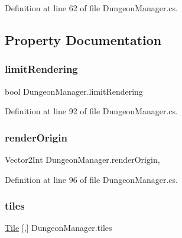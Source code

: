 Definition at line 62 of file Dungeon\+Manager.\+cs.



\subsection{Property Documentation}
\mbox{\label{class_dungeon_manager_a6f04a65ae61dd9b11d58489272b5fa70}} 
\subsubsection{\texorpdfstring{limitRendering}{limitRendering}}
{\footnotesize\ttfamily bool Dungeon\+Manager.\+limit\+Rendering\hspace{0.3cm}{\ttfamily [get]}}



Definition at line 92 of file Dungeon\+Manager.\+cs.

\mbox{\label{class_dungeon_manager_af1c37437d9ec1f72c4dc6a0300d226df}} 
\subsubsection{\texorpdfstring{renderOrigin}{renderOrigin}}
{\footnotesize\ttfamily Vector2\+Int Dungeon\+Manager.\+render\+Origin\hspace{0.3cm}{\ttfamily [get]}, {\ttfamily [set]}}



Definition at line 96 of file Dungeon\+Manager.\+cs.

\mbox{\label{class_dungeon_manager_a35b1117b28fd54ff805320dc50fd206d}} 
\subsubsection{\texorpdfstring{tiles}{tiles}}
{\footnotesize\ttfamily \mbox{\hyperlink{class_tile}{Tile}} \mbox{[},\mbox{]} Dungeon\+Manager.\+tiles\hspace{0.3cm}{\ttfamily [get]}}



